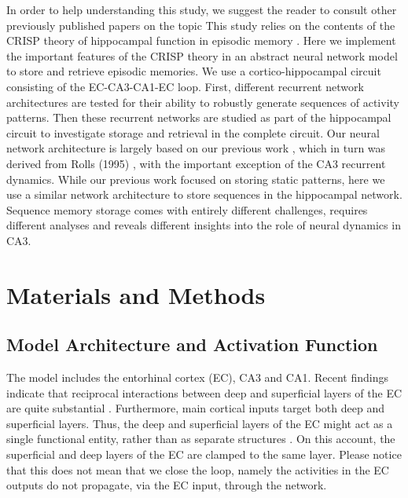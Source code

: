 \documentclass[utf8]{frontiersSCNS} %
\begin{document}
In order to help understanding this study, we suggest the reader to consult other previously published papers on the topic \cite{cheng2013crisp, neher2015memory}
%
This study relies on the contents of the CRISP theory of hippocampal function in episodic memory \cite{cheng2013crisp}. 
% 
Here we implement the important features of the CRISP theory in an abstract neural network model to store and retrieve episodic memories. We use a cortico-hippocampal circuit consisting of the EC-CA3-CA1-EC loop. 
%
First, different recurrent network architectures are tested for their ability to robustly generate sequences of activity patterns. 
%
Then these recurrent networks are studied as part of the hippocampal circuit to investigate storage and retrieval in the complete circuit.
%
Our neural network architecture is largely based on our previous work \cite{neher2015memory}, which in turn was derived from Rolls (1995) \cite{fontanari1995model}, with the important exception of the CA3 recurrent dynamics. 
%
While our previous work focused on storing static patterns, here we use a similar network architecture to store sequences in the hippocampal network. Sequence memory storage comes with entirely different challenges, requires different analyses and reveals different insights into the role of neural dynamics in CA3. 

\section{Materials and Methods}




\subsection{Model Architecture and Activation Function}


The model includes the entorhinal cortex (EC), CA3 and CA1. 
%
%
Recent findings indicate that reciprocal interactions between deep and superficial layers of the EC are quite substantial \cite{canto2008does, van2003morphological}. Furthermore, main cortical inputs target both deep and superficial layers. Thus, the deep and superficial layers of the EC might act as a single functional entity, rather than as separate structures \cite{kloosterman2000functional}.
%
On this account, the superficial and deep layers of the EC are clamped to the same layer. Please notice that this does not mean that we close the loop, namely the activities in the EC outputs do not propagate, via the EC input, through the network.
\end{document}
